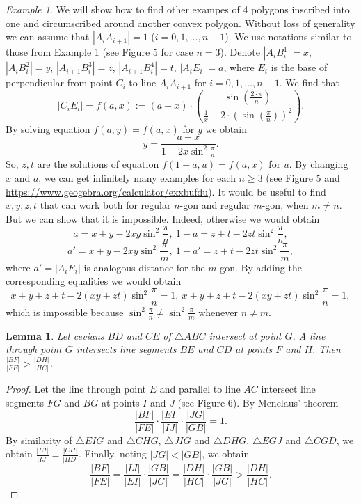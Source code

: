 \documentclass{birkjour}
\newtheorem{lemma}[theorem]{Lemma}
\theoremstyle{definition}
\theoremstyle{remark}
\newtheorem{example}{Example}
\numberwithin{equation}{section}
\begin{document}
\begin{example}
We will show how to find other exampes of 4 polygons inscribed into one and circumscribed around another convex polygon. Without loss of generality we can assume that $|A_iA_{i+1}|=1$ ($i=0,1,\ldots,n-1$). We use notations similar to those from Example 1 (see Figure 5 for case $n=3$). Denote $|A_iB_i^1|=x$, $|A_iB_i^2|=y$, $|A_{i+1}B_i^3|=z$, $|A_{i+1}B_i^4|=t$, $|A_iE_i|=a$, where $E_i$ is the base of perpendicular from point $C_i$ to line $A_iA_{i+1}$ for $i=0,1,\ldots,n-1$. We find that
$$
|C_iE_i|=f\left(a,x\right):= \left(a-x\right)\cdot \left(\frac{\sin\left(\frac{2\cdot \pi}{n}\right)}{\frac{1}{x}-2\cdot \left(\sin\left(\frac{\pi}{n}\right)\right)^{2}}\right).
$$
By solving equation $f(a,y)=f(a,x)$ for $y$ we obtain
$$
y=\frac{a-x}{1-2x\sin^2{\frac{\pi}{n}}}.
$$
So, $z,t$ are the solutions of equation $f(1-a,u)=f(a,x)$ for $u$. By changing $x$ and $a$, we can get infinitely many examples for each $n\ge3$ (see Figure 5 and \url{https://www.geogebra.org/calculator/exxbufdu}). It would be useful to find $x,y,z,t$ that can work both for regular $n$-gon and regular $m$-gon, when $m\ne n$. But we can show that it is impossible. Indeed, otherwise we would obtain
$$
a=x+y-2xy\sin^2{\frac{\pi}{n}},\ 1-a=z+t-2zt\sin^2{\frac{\pi}{n}},
$$
$$
a'=x+y-2xy\sin^2{\frac{\pi}{m}},\ 1-a'=z+t-2zt\sin^2{\frac{\pi}{m}},
$$
where $a'=|A_iE_i|$ is analogous distance for the $m$-gon. By adding the corresponding equalities we would obtain
$$
x+y+z+t-2(xy+zt)\sin^2{\frac{\pi}{n}}=1,\ x+y+z+t-2(xy+zt)\sin^2{\frac{\pi}{n}}=1,
$$
which is impossible because $\sin^2{\frac{\pi}{n}}\ne\sin^2{\frac{\pi}{m}}$ whenever $n\ne m$.
\end{example}

\begin{lemma}
Let cevians $BD$ and $CE$ of $\triangle ABC$ intersect at point $G$. A line through point $G$ intersects line segments $BE$ and $CD$ at points $F$ and $H$. Then $\frac{|BF|}{|FE|}>\frac{|DH|}{|HC|}$.
\end{lemma}

\begin{proof}
Let the line through point $E$ and parallel to line $AC$ intersect line segments $FG$ and $BG$ at points $I$ and $J$ (see Figure 6). By Menelaus' theorem $$\frac{|BF|}{|FE|}\cdot \frac{|EI|}{|IJ|}\cdot \frac{|JG|}{|GB|}=1.$$
By similarity of $\triangle EIG$ and $\triangle CHG$, $\triangle JIG$ and $\triangle DHG$, $\triangle EGJ$ and $\triangle CGD$, we obtain $\frac{|EI|}{|IJ|}=\frac{|CH|}{|HD|}$. Finally, noting $|JG|<|GB|$, we obtain $$\frac{|BF|}{|FE|}=\frac{|IJ|}{|EI|}\cdot \frac{|GB|}{|JG|}=\frac{|DH|}{|HC|}\cdot \frac{|GB|}{|JG|}>\frac{|DH|}{|HC|}.$$
\end{proof}
\end{document}

